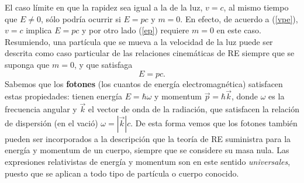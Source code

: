 El caso límite en que la rapidez sea igual a la de la luz, $v=c$, al mismo tiempo que $E\neq 0$, sólo podría ocurrir si $E=pc$ y $m=0$. En efecto, de acuerdo a (\ref{vpe}), $v=c$ implica $E=pc$ y por otro lado (\ref{ep}) requiere $m=0$ en este caso. Resumiendo, una partícula que se mueva a la velocidad de la luz puede ser descrita como caso particular de las relaciones cinemáticas de RE siempre que se suponga que $m=0$, y que satisfaga
\begin{equation}
E=pc.
\end{equation}
Sabemos que los \textbf{fotones} (los cuantos de energía electromagnética) satisfacen estas propiedades: tienen energía $E=\hbar\omega$ y momentum $\vec{p}=\hbar\vec{k}$, donde $\omega$ es la frecuencia angular y $\vec{k}$ el vector de onda de la radiación, que satisfacen la relación de dispersión (en el vació) $\omega=|\vec{k}|c$. De esta forma vemos que los fotones también pueden ser incorporados a la descripción que la teoría de RE suministra para la energía y momentum de un cuerpo, siempre que se considere su masa nula. Las expresiones relativistas de energía y momentum son en este sentido \textit{universales}, puesto que se aplican a todo tipo de partícula o cuerpo conocido.



